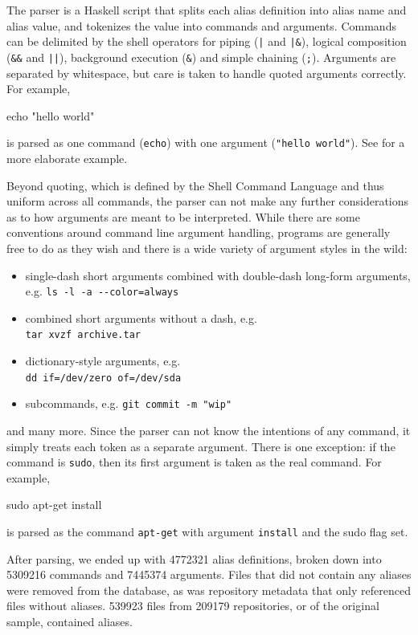 The parser is a Haskell script that splits each alias definition into alias name and alias value, and tokenizes the value into commands and arguments.
Commands can be delimited by the shell operators for piping (\verb!|! and \verb!|&!), logical composition (\verb|&&| and \verb!||!), background execution (\verb|&|) and simple chaining (\verb|;|).
Arguments are separated by whitespace, but care is taken to handle quoted arguments correctly. 
For example, 
\begin{CVerbatim}
echo "hello world"
\end{CVerbatim}
is parsed as one command (\texttt{echo}) with one argument (\texttt{"hello world"}).
See  for a more elaborate example.



Beyond quoting, which is defined by the Shell Command Language and thus uniform across all commands, the parser can not make any further considerations as to how arguments are meant to be interpreted.
While there are some conventions around command line argument handling, programs are generally free to do as they wish and there is a wide variety of argument styles in the wild:
\begin{itemize}
    \item single-dash short arguments combined with double-dash long-form arguments, e.g. \verb|ls -l -a --color=always|
    \item combined short arguments without a dash, e.g. \\ \verb|tar xvzf archive.tar|
    \item dictionary-style arguments, e.g. \\ \verb|dd if=/dev/zero of=/dev/sda|
    \item subcommands, e.g. \verb|git commit -m "wip"|
\end{itemize}
and many more.
Since the parser can not know the intentions of any command, it simply treats each token as a separate argument.
There is one exception: if the command is \texttt{sudo}, then its first argument is taken as the real command. 
For example,
\begin{CVerbatim}
sudo apt-get install
\end{CVerbatim} 
is parsed as the command \texttt{apt-get} with argument \texttt{install} and the sudo flag set.

After parsing, we ended up with \num{4772321} alias definitions, broken down into \num{5309216} commands and \num{7445374} arguments.
Files that did not contain any aliases were removed from the database, as was repository metadata that only referenced files without aliases.
\num{539923} files from \num{209179} repositories, or  of the original sample, contained aliases.

